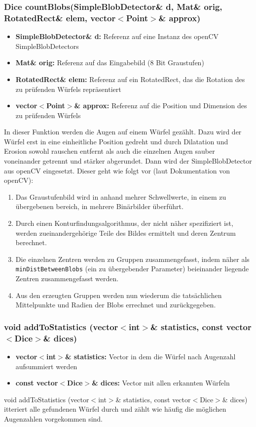 \documentclass{../Vorlage/sebDenCls}
\begin{document}
\subsubsection{Dice countBlobs(SimpleBlobDetector\& d, Mat\& orig, RotatedRect\& elem, vector$<$Point$>$\& approx)}
\begin{itemize}
	\item \textbf{SimpleBlobDetector\& d:} Referenz auf eine Instanz des openCV SimpleBlobDetectors
	\item \textbf{Mat\& orig:} Referenz auf das Eingabebild (8 Bit Graustufen)
	\item \textbf{RotatedRect\& elem:} Referenz auf ein RotatedRect, das die Rotation des zu prüfenden Würfels repräsentiert
	\item \textbf{vector$<$Point$>$\& approx:} Referenz auf die Position und Dimension des zu prüfenden Würfels
\end{itemize}
In dieser Funktion werden die Augen auf einem Würfel gezählt. Dazu wird der Würfel erst in eine einheitliche Position gedreht und durch Dilatation und Erosion sowohl rauschen entfernt als auch die einzelnen Augen sauber voneinander getrennt und stärker abgerundet. Dann wird der SimpleBlobDetector aus openCV eingesetzt. Dieser geht wie folgt vor (laut Dokumentation von openCV):\\
\begin{enumerate}
	\item Das Graustufenbild wird in anhand mehrer Schwellwerte, in einem zu übergebenen bereich, in mehrere Binärbilder überführt.
	\item Durch einen Konturfindungsalgorithmus, der nicht näher spezifiziert ist, werden zueinandergehörige Teile des Bildes ermittelt und deren Zentrum berechnet.
	\item Die einzelnen Zentren werden zu Gruppen zusammengefasst, indem näher als \texttt{minDistBetweenBlobs} (ein zu übergebender Parameter) beieinander liegende Zentren zusammengefasst werden.
	\item Aus den erzeugten Gruppen werden nun wiederum die tatsächlichen Mittelpunkte und Radien der Blobs errechnet und zurückgegeben.
\end{enumerate}

\subsubsection{void addToStatistics (vector$<$int$>$\& statistics, const vector$<$Dice$>$\& dices)}
\begin{itemize}
	\item \textbf{vector$<$int$>$\& statistics:} Vector in dem die Würfel nach Augenzahl aufsummiert werden
	\item \textbf{const vector$<$Dice$>$\& dices:} Vector mit allen erkannten Würfeln
\end{itemize}
void addToStatistics (vector$<$int$>$\& statistics, const vector$<$Dice$>$\& dices) itteriert alle gefundenen Würfel durch und zählt wie häufig die möglichen Augenzahlen vorgekommen sind.
\end{document}
